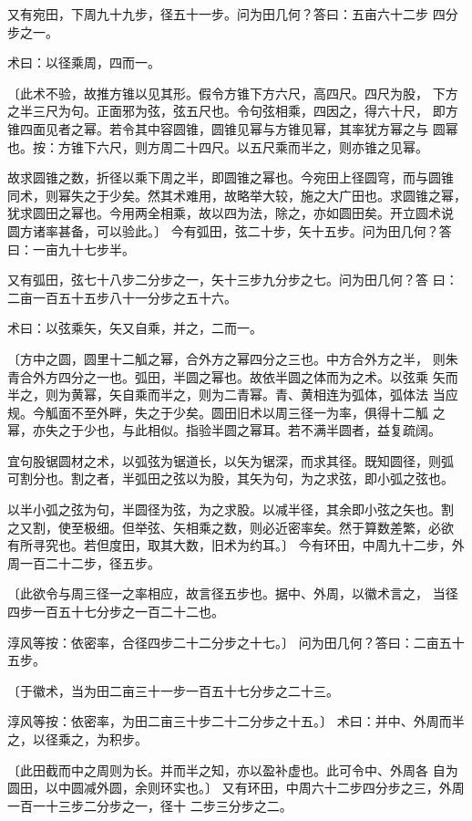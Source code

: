 \documentclass[a4paper,12pt,UTF8,twoside]{ctexbook}
\begin{document}
又有宛田，下周九十九步，径五十一步。问为田几何？答曰：五亩六十二步 四分步之一。

术曰：以径乘周，四而一。

〔此术不验，故推方锥以见其形。假令方锥下方六尺，高四尺。四尺为股， 下方之半三尺为句。正面邪为弦，弦五尺也。令句弦相乘，四因之，得六十尺， 即方锥四面见者之幂。若令其中容圆锥，圆锥见幂与方锥见幂，其率犹方幂之与 圆幂也。按：方锥下六尺，则方周二十四尺。以五尺乘而半之，则亦锥之见幂。

故求圆锥之数，折径以乘下周之半，即圆锥之幂也。今宛田上径圆穹，而与圆锥 同术，则幂失之于少矣。然其术难用，故略举大较，施之大广田也。求圆锥之幂， 犹求圆田之幂也。今用两全相乘，故以四为法，除之，亦如圆田矣。开立圆术说 圆方诸率甚备，可以验此。〕 今有弧田，弦二十步，矢十五步。问为田几何？答曰：一亩九十七步半。

又有弧田，弦七十八步二分步之一，矢十三步九分步之七。问为田几何？答 曰：二亩一百五十五步八十一分步之五十六。

术曰：以弦乘矢，矢又自乘，并之，二而一。

〔方中之圆，圆里十二觚之幂，合外方之幂四分之三也。中方合外方之半， 则朱青合外方四分之一也。弧田，半圆之幂也。故依半圆之体而为之术。以弦乘 矢而半之，则为黄幂，矢自乘而半之，则为二青幂。青、黄相连为弧体，弧体法 当应规。今觚面不至外畔，失之于少矣。圆田旧术以周三径一为率，俱得十二觚 之幂，亦失之于少也，与此相似。指验半圆之幂耳。若不满半圆者，益复疏阔。

宜句股锯圆材之术，以弧弦为锯道长，以矢为锯深，而求其径。既知圆径，则弧 可割分也。割之者，半弧田之弦以为股，其矢为句，为之求弦，即小弧之弦也。

以半小弧之弦为句，半圆径为弦，为之求股。以减半径，其余即小弦之矢也。割 之又割，使至极细。但举弦、矢相乘之数，则必近密率矣。然于算数差繁，必欲 有所寻究也。若但度田，取其大数，旧术为约耳。〕 今有环田，中周九十二步，外周一百二十二步，径五步。

〔此欲令与周三径一之率相应，故言径五步也。据中、外周，以徽术言之， 当径四步一百五十七分步之一百二十二也。

淳风等按：依密率，合径四步二十二分步之十七。〕 问为田几何？答曰：二亩五十五步。

〔于徽术，当为田二亩三十一步一百五十七分步之二十三。

淳风等按：依密率，为田二亩三十步二十二分步之十五。〕 术曰：并中、外周而半之，以径乘之，为积步。

〔此田截而中之周则为长。并而半之知，亦以盈补虚也。此可令中、外周各 自为圆田，以中圆减外圆，余则环实也。〕 又有环田，中周六十二步四分步之三，外周一百一十三步二分步之一，径十 二步三分步之二。
\end{document}
